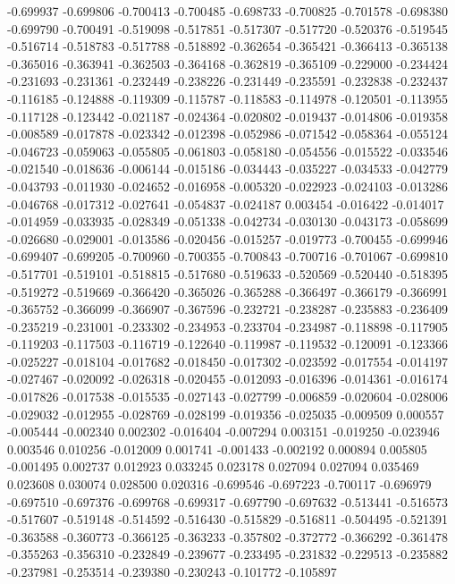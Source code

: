 -0.699937
-0.699806
-0.700413
-0.700485
-0.698733
-0.700825
-0.701578
-0.698380
-0.699790
-0.700491
-0.519098
-0.517851
-0.517307
-0.517720
-0.520376
-0.519545
-0.516714
-0.518783
-0.517788
-0.518892
-0.362654
-0.365421
-0.366413
-0.365138
-0.365016
-0.363941
-0.362503
-0.364168
-0.362819
-0.365109
-0.229000
-0.234424
-0.231693
-0.231361
-0.232449
-0.238226
-0.231449
-0.235591
-0.232838
-0.232437
-0.116185
-0.124888
-0.119309
-0.115787
-0.118583
-0.114978
-0.120501
-0.113955
-0.117128
-0.123442
-0.021187
-0.024364
-0.020802
-0.019437
-0.014806
-0.019358
-0.008589
-0.017878
-0.023342
-0.012398
-0.052986
-0.071542
-0.058364
-0.055124
-0.046723
-0.059063
-0.055805
-0.061803
-0.058180
-0.054556
-0.015522
-0.033546
-0.021540
-0.018636
-0.006144
-0.015186
-0.034443
-0.035227
-0.034533
-0.042779
-0.043793
-0.011930
-0.024652
-0.016958
-0.005320
-0.022923
-0.024103
-0.013286
-0.046768
-0.017312
-0.027641
-0.054837
-0.024187
0.003454
-0.016422
-0.014017
-0.014959
-0.033935
-0.028349
-0.051338
-0.042734
-0.030130
-0.043173
-0.058699
-0.026680
-0.029001
-0.013586
-0.020456
-0.015257
-0.019773
-0.700455
-0.699946
-0.699407
-0.699205
-0.700960
-0.700355
-0.700843
-0.700716
-0.701067
-0.699810
-0.517701
-0.519101
-0.518815
-0.517680
-0.519633
-0.520569
-0.520440
-0.518395
-0.519272
-0.519669
-0.366420
-0.365026
-0.365288
-0.366497
-0.366179
-0.366991
-0.365752
-0.366099
-0.366907
-0.367596
-0.232721
-0.238287
-0.235883
-0.236409
-0.235219
-0.231001
-0.233302
-0.234953
-0.233704
-0.234987
-0.118898
-0.117905
-0.119203
-0.117503
-0.116719
-0.122640
-0.119987
-0.119532
-0.120091
-0.123366
-0.025227
-0.018104
-0.017682
-0.018450
-0.017302
-0.023592
-0.017554
-0.014197
-0.027467
-0.020092
-0.026318
-0.020455
-0.012093
-0.016396
-0.014361
-0.016174
-0.017826
-0.017538
-0.015535
-0.027143
-0.027799
-0.006859
-0.020604
-0.028006
-0.029032
-0.012955
-0.028769
-0.028199
-0.019356
-0.025035
-0.009509
0.000557
-0.005444
-0.002340
0.002302
-0.016404
-0.007294
0.003151
-0.019250
-0.023946
0.003546
0.010256
-0.012009
0.001741
-0.001433
-0.002192
0.000894
0.005805
-0.001495
0.002737
0.012923
0.033245
0.023178
0.027094
0.027094
0.035469
0.023608
0.030074
0.028500
0.020316
-0.699546
-0.697223
-0.700117
-0.696979
-0.697510
-0.697376
-0.699768
-0.699317
-0.697790
-0.697632
-0.513441
-0.516573
-0.517607
-0.519148
-0.514592
-0.516430
-0.515829
-0.516811
-0.504495
-0.521391
-0.363588
-0.360773
-0.366125
-0.363233
-0.357802
-0.372772
-0.366292
-0.361478
-0.355263
-0.356310
-0.232849
-0.239677
-0.233495
-0.231832
-0.229513
-0.235882
-0.237981
-0.253514
-0.239380
-0.230243
-0.101772
-0.105897
